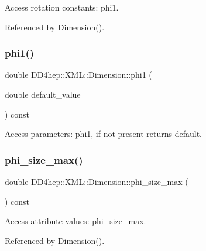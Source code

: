Access rotation constants\+: phi1. 



Referenced by Dimension().

\hypertarget{struct_d_d4hep_1_1_x_m_l_1_1_dimension_a7abed4e7679ef88dfec6259a9ba779c8}{}\label{struct_d_d4hep_1_1_x_m_l_1_1_dimension_a7abed4e7679ef88dfec6259a9ba779c8} 
\subsubsection{\texorpdfstring{phi1()}{phi1()}\hspace{0.1cm}{\footnotesize\ttfamily [2/2]}}
{\footnotesize\ttfamily double D\+D4hep\+::\+X\+M\+L\+::\+Dimension\+::phi1 (\begin{DoxyParamCaption}\item[{double}]{default\+\_\+value }\end{DoxyParamCaption}) const}



Access parameters\+: phi1, if not present returns default. 

\hypertarget{struct_d_d4hep_1_1_x_m_l_1_1_dimension_a6be32d05b445cddc97d91a0eb2cdff05}{}\label{struct_d_d4hep_1_1_x_m_l_1_1_dimension_a6be32d05b445cddc97d91a0eb2cdff05} 
\subsubsection{\texorpdfstring{phi\+\_\+size\+\_\+max()}{phi\_size\_max()}}
{\footnotesize\ttfamily double D\+D4hep\+::\+X\+M\+L\+::\+Dimension\+::phi\+\_\+size\+\_\+max (\begin{DoxyParamCaption}{ }\end{DoxyParamCaption}) const}



Access attribute values\+: phi\+\_\+size\+\_\+max. 



Referenced by Dimension().

\hypertarget{struct_d_d4hep_1_1_x_m_l_1_1_dimension_a97807b4bec80b5b2edc22a7fcd7f1442}{}\label{struct_d_d4hep_1_1_x_m_l_1_1_dimension_a97807b4bec80b5b2edc22a7fcd7f1442} 
